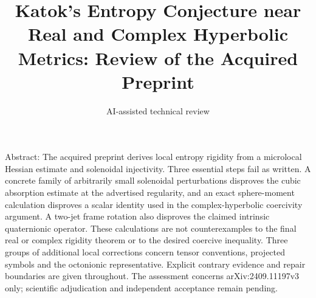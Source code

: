 \documentclass[10pt]{article}
\title{Katok’s Entropy Conjecture near Real and Complex Hyperbolic Metrics:
Review of the Acquired Preprint}
\author{AI-assisted technical review}
\date{}
\begin{document}
\maketitle
Abstract: The acquired preprint derives local entropy rigidity from a microlocal Hessian estimate and solenoidal injectivity. Three essential steps fail as written. A concrete family of arbitrarily small solenoidal perturbations disproves the cubic absorption estimate at the advertised regularity, and an exact sphere-moment calculation disproves a scalar identity used in the complex-hyperbolic coercivity argument. A two-jet frame rotation also disproves the claimed intrinsic quaternionic operator. These calculations are not counterexamples to the final real or complex rigidity theorem or to the desired coercive inequality. Three groups of additional local corrections concern tensor conventions, projected symbols and the octonionic representative. Explicit contrary evidence and repair boundaries are given throughout. The assessment concerns arXiv:2409.11197v3 only; scientific adjudication and independent acceptance remain pending.\par
\end{document}
